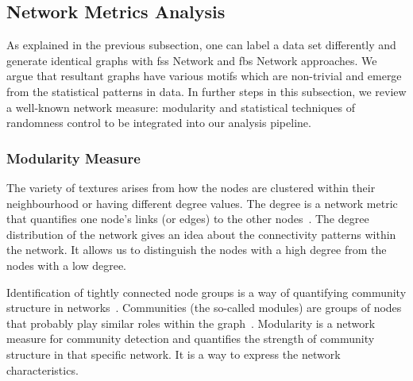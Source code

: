 \subsection{Network Metrics Analysis}
As explained in the previous subsection, one can label a data set differently and generate identical graphs with \acs{fss} Network and \acs{fbs} Network approaches. We argue that resultant graphs have various motifs which are non-trivial and emerge from the statistical patterns in data. In further steps in this subsection, we review a well-known network measure: modularity and statistical techniques of randomness control to be integrated into our analysis pipeline.
\subsubsection*{Modularity Measure}
The variety of textures arises from how the nodes are clustered within their neighbourhood or having different degree values. The degree is a network metric that quantifies one node's links (or edges) to the other nodes~\cite{Barabasi2016}. The degree distribution of the network gives an idea about the connectivity patterns within the network. It allows us to distinguish the nodes with a high degree from the nodes with a low degree.

Identification of tightly connected node groups is a way of quantifying community structure in networks~\cite{Girvan7821}. Communities (the so-called modules) are groups of nodes that probably play similar roles within the graph~\cite{FORTUNATO201075}. Modularity is a network measure for community detection and quantifies the strength of community structure in that specific network. It is a way to express the network characteristics.


